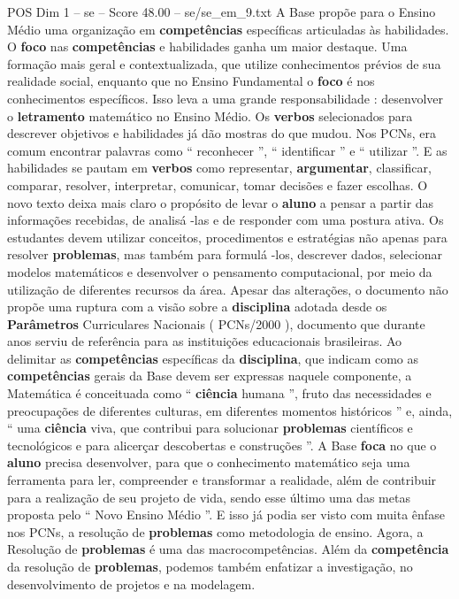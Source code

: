 \begin{textsample}{POS Dim 1 – se – Score 48.00 – se/se\_em\_9.txt}
A Base propõe para o Ensino Médio uma organização em \textbf{competências} específicas articuladas às habilidades.
O \textbf{foco} nas \textbf{competências} e habilidades ganha um maior destaque.
Uma formação mais geral e contextualizada, que utilize conhecimentos prévios de sua realidade social, enquanto que no Ensino Fundamental o \textbf{foco} é nos conhecimentos específicos.
Isso leva a uma grande responsabilidade : desenvolver o \textbf{letramento} matemático no Ensino Médio.
Os \textbf{verbos} selecionados para descrever objetivos e habilidades já dão mostras do que mudou.
Nos PCNs, era comum encontrar palavras como “ reconhecer ”, “ identificar ” e “ utilizar ”.
E as habilidades se pautam em \textbf{verbos} como representar, \textbf{argumentar}, classificar, comparar, resolver, interpretar, comunicar, tomar decisões e fazer escolhas.
O novo texto deixa mais claro o propósito de levar o \textbf{aluno} a pensar a partir das informações recebidas, de analisá -las e de responder com uma postura ativa.
Os estudantes devem utilizar conceitos, procedimentos e estratégias não apenas para resolver \textbf{problemas}, mas também para formulá -los, descrever dados, selecionar modelos matemáticos e desenvolver o pensamento computacional, por meio da utilização de diferentes recursos da área.
Apesar das alterações, o documento não propõe uma ruptura com a visão sobre a \textbf{disciplina} adotada desde os \textbf{Parâmetros} Curriculares Nacionais ( PCNs/2000 ), documento que durante anos serviu de referência para as instituições educacionais brasileiras.
Ao delimitar as \textbf{competências} específicas da \textbf{disciplina}, que indicam como as \textbf{competências} gerais da Base devem ser expressas naquele componente, a Matemática é conceituada como “ \textbf{ciência} humana ”, fruto das necessidades e preocupações de diferentes culturas, em diferentes momentos históricos ” e, ainda, “ uma \textbf{ciência} viva, que contribui para solucionar \textbf{problemas} científicos e tecnológicos e para alicerçar descobertas e construções ”.
A Base \textbf{foca} no que o \textbf{aluno} precisa desenvolver, para que o conhecimento matemático seja uma ferramenta para ler, compreender e transformar a realidade, além de contribuir para a realização de seu projeto de vida, sendo esse último uma das metas proposta pelo “ Novo Ensino Médio ”.
E isso já podia ser visto com muita ênfase nos PCNs, a resolução de \textbf{problemas} como metodologia de ensino.
Agora, a Resolução de \textbf{problemas} é uma das macrocompetências.
Além da \textbf{competência} da resolução de \textbf{problemas}, podemos também enfatizar a investigação, no desenvolvimento de projetos e na modelagem.

\end{textsample}
